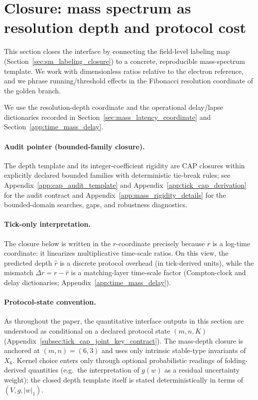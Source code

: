 \section{Closure: mass spectrum as resolution depth and protocol cost}
\label{sec:mass_spectrum_closure}

This section closes the interface by connecting the field-level labeling map (Section~\ref{sec:sm_labeling_closure}) to a concrete, reproducible mass-spectrum template.
We work with dimensionless ratios relative to the electron reference, and we phrase running/threshold effects in the Fibonacci resolution coordinate of the golden branch.

We use the resolution-depth coordinate and the operational delay/lapse dictionaries recorded in Section~\ref{sec:mass_latency_coordinate} and Section~\ref{app:time_mass_delay}.

\paragraph{Audit pointer (bounded-family closure).}
\AuditTag The depth template and its integer-coefficient rigidity are CAP closures within explicitly declared bounded families with deterministic tie-break rules; see Appendix~\ref{app:cap_audit_template} and Appendix~\ref{app:tick_cap_derivation} for the audit contract and Appendix~\ref{app:mass_rigidity_details} for the bounded-domain searches, gaps, and robustness diagnostics.

\paragraph{Tick-only interpretation.}
The closure below is written in the $r$-coordinate precisely because $r$ is a log-time coordinate: it linearizes multiplicative time-scale ratios.
On this view, the predicted depth $\widehat r$ is a discrete protocol overhead (in tick-derived units), while the mismatch $\Delta r=r-\widehat r$ is a matching-layer time-scale factor (Compton-clock and delay dictionaries; Appendix~\ref{app:time_mass_delay}).

\paragraph{Protocol-state convention.}
\AuditTag As throughout the paper, the quantitative interface outputs in this section are understood as conditional on a declared protocol state $(m,n,K)$ (Appendix~\ref{subsec:tick_cap_joint_key_contract}).
The mass-depth closure is anchored at $(m,n)=(6,3)$ and uses only intrinsic stable-type invariants of $X_6$.
Kernel choice enters only through optional probabilistic readings of folding-derived quantities (e.g.\ the interpretation of $g(w)$ as a residual uncertainty weight); the closed depth template itself is stated deterministically in terms of $(V,g,|w|_1)$.

